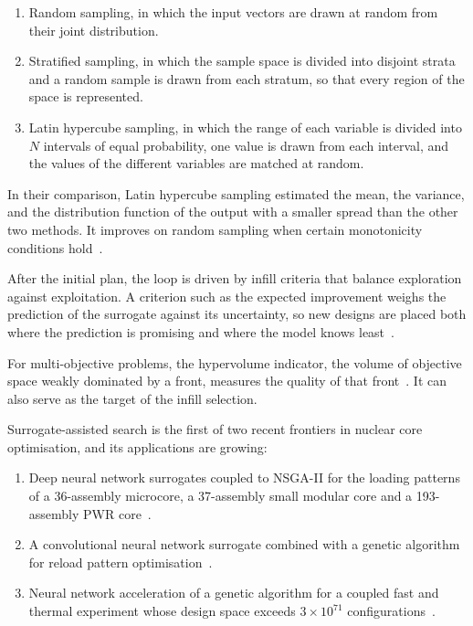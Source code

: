 \begin{enumerate}
  \item Random sampling, in which the input vectors are drawn at random
        from their joint distribution.

  \item Stratified sampling, in which the sample space is divided into
        disjoint strata and a random sample is drawn from each stratum,
        so that every region of the space is represented.

  \item Latin hypercube sampling, in which the range of each variable is
        divided into $N$ intervals of equal probability, one value is
        drawn from each interval, and the values of the different
        variables are matched at random.
\end{enumerate}

In their comparison, Latin hypercube sampling estimated the mean, the
variance, and the distribution function of the output with a smaller
spread than the other two methods. It improves on random sampling when
certain monotonicity conditions hold~\cite{mckay_lhs_1979}.

After the initial plan, the loop is driven by infill criteria that
balance exploration against exploitation. A criterion such as the
expected improvement weighs the prediction of the surrogate against its
uncertainty, so new designs are placed both where the prediction is
promising and where the model knows least~\cite{forrester_book_2008}.

For multi-objective problems, the hypervolume indicator, the volume of
objective space weakly dominated by a front, measures the quality of
that front~\cite{zitzler_2003_performance}. It can also serve as the
target of the infill selection.

Surrogate-assisted search is the first of two recent frontiers in
nuclear core optimisation, and its applications are growing:

\begin{enumerate}
  \item Deep neural network surrogates coupled to NSGA-II for the loading
        patterns of a 36-assembly microcore, a 37-assembly small modular
        core and a 193-assembly PWR core~\cite{whyte_2020}.

  \item A convolutional neural network surrogate combined with a
        genetic algorithm for reload pattern
        optimisation~\cite{wan_2022}.

  \item Neural network acceleration of a genetic algorithm for a
        coupled fast and thermal experiment whose design space exceeds
        $3\times10^{71}$ configurations~\cite{pevey_2022}.
\end{enumerate}

